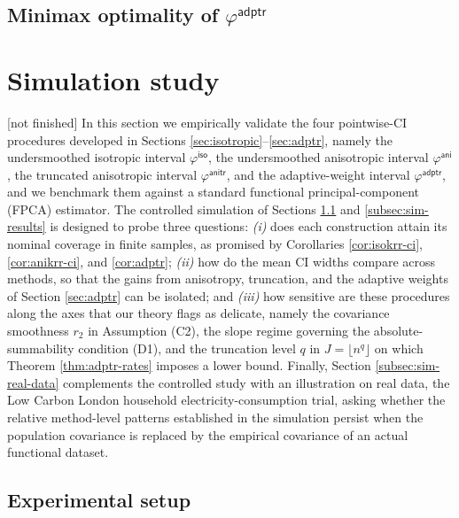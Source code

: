 \documentclass[11pt,a4paper]{article}
\theoremstyle{definition}
\theoremstyle{plain}
\theoremstyle{remark}
\newcommand{\iso}{\mathsf{iso}}
\newcommand{\ani}{\mathsf{ani}}
\newcommand{\anitr}{\mathsf{anitr}}
\newcommand{\adptr}{\mathsf{adptr}}
\begin{document}
\subsection{Minimax optimality of $\varphi^{\adptr}$}


\section{Simulation study}\label{sec:simulation}
[not finished]
In this section we empirically validate the four pointwise-CI procedures developed in Sections \ref{sec:isotropic}--\ref{sec:adptr}, namely the undersmoothed isotropic interval $\varphi^{\iso}$, the undersmoothed anisotropic interval $\varphi^{\ani}$, the truncated anisotropic interval $\varphi^{\anitr}$, and the adaptive-weight interval $\varphi^{\adptr}$, and we benchmark them against a standard functional principal-component (FPCA) estimator. The controlled simulation of Sections \ref{subsec:sim-setup} and \ref{subsec:sim-results} is designed to probe three questions: \emph{(i)} does each construction attain its nominal coverage in finite samples, as promised by Corollaries \ref{cor:isokrr-ci}, \ref{cor:anikrr-ci}, and \ref{cor:adptr}; \emph{(ii)} how do the mean CI widths compare across methods, so that the gains from anisotropy, truncation, and the adaptive weights of Section \ref{sec:adptr} can be isolated; and \emph{(iii)} how sensitive are these procedures along the axes that our theory flags as delicate, namely the covariance smoothness $r_2$ in Assumption (C2), the slope regime governing the absolute-summability condition (D1), and the truncation level $q$ in $J=\lfloor n^q\rfloor$ on which Theorem \ref{thm:adptr-rates} imposes a lower bound. Finally, Section \ref{subsec:sim-real-data} complements the controlled study with an illustration on real data, the Low Carbon London household electricity-consumption trial, asking whether the relative method-level patterns established in the simulation persist when the population covariance is replaced by the empirical covariance of an actual functional dataset.

\subsection{Experimental setup}\label{subsec:sim-setup}
\end{document}

